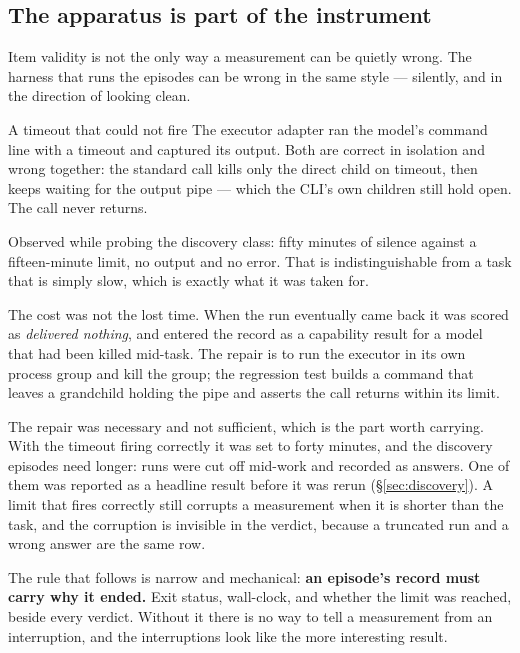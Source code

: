 \documentclass[11pt]{article}
\theoremstyle{definition}
\begin{document}
\subsection{The apparatus is part of the instrument}\label{sec:apparatus}

Item validity is not the only way a measurement can be quietly wrong. The harness that runs the episodes can be wrong in the same style --- silently, and in the direction of looking clean.

\begin{cautionbox}{A timeout that could not fire}
The executor adapter ran the model's command line with a timeout and captured its output. Both are correct in isolation and wrong together: the standard call kills only the direct child on timeout, then keeps waiting for the output pipe --- which the CLI's own children still hold open. The call never returns.

Observed while probing the discovery class: fifty minutes of silence against a fifteen-minute limit, no output and no error. That is indistinguishable from a task that is simply slow, which is exactly what it was taken for.

The cost was not the lost time. When the run eventually came back it was scored as \emph{delivered nothing}, and entered the record as a capability result for a model that had been killed mid-task. The repair is to run the executor in its own process group and kill the group; the regression test builds a command that leaves a grandchild holding the pipe and asserts the call returns within its limit.
\end{cautionbox}

The repair was necessary and not sufficient, which is the part worth carrying. With the timeout firing correctly it was set to forty minutes, and the discovery episodes need longer: runs were cut off mid-work and recorded as answers. One of them was reported as a headline result before it was rerun (\S\ref{sec:discovery}). A limit that fires correctly still corrupts a measurement when it is shorter than the task, and the corruption is invisible in the verdict, because a truncated run and a wrong answer are the same row.

The rule that follows is narrow and mechanical: \textbf{an episode's record must carry why it ended.} Exit status, wall-clock, and whether the limit was reached, beside every verdict. Without it there is no way to tell a measurement from an interruption, and the interruptions look like the more interesting result.
\end{document}
